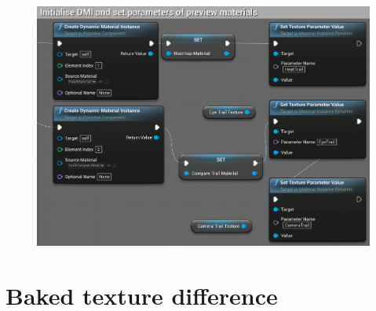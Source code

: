 \begin{figure}[!ht]
    \centering
    \includegraphics[width=\textwidth]{img/appendix/ETcomponent-DMI.png}
\end{figure}

\chapter{Baked texture difference}
\label{appendix:baked-textures}

